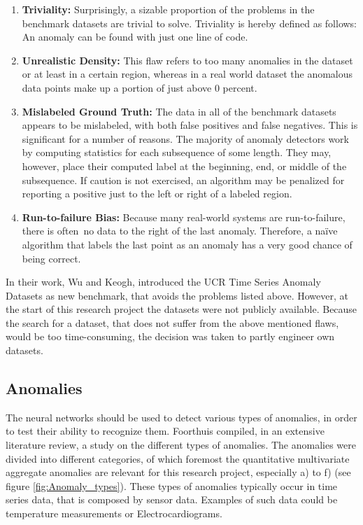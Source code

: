 \begin{enumerate}
	\item \textbf{Triviality:} Surprisingly, a sizable proportion of the problems in the benchmark datasets are trivial to solve. Triviality is hereby defined as follows: An anomaly can be found with just one line of code.
	\item \textbf{Unrealistic Density:} This flaw refers to too many anomalies in the dataset or at least in a certain region, whereas in a real world dataset the anomalous data points make up a portion of just above 0 percent.   
	\item \textbf{Mislabeled Ground Truth:} The data in all of the benchmark datasets appears to be mislabeled, with both false positives and false negatives. This is significant for a number of reasons. The majority of anomaly detectors work by computing statistics for each subsequence of some length. They may, however, place their computed label at the beginning, end, or middle of the subsequence. If caution is not exercised, an algorithm may be penalized for reporting a positive just to the left or right of a labeled region.
	\item \textbf{Run-to-failure Bias:} Because many real-world systems are run-to-failure, there is often no data to the right of the last anomaly. Therefore, a naïve algorithm that labels the last point as an anomaly has a very good chance of being correct.
\end{enumerate}

In their work, Wu and Keogh, introduced the UCR Time Series Anomaly Datasets as new benchmark, that avoids the problems listed above. However, at the start of this research project the datasets were not publicly available. Because the search for a dataset, that does not suffer from the above mentioned flaws, would be too time-consuming, the decision was taken to partly engineer own datasets.
\newline
\subsection{Anomalies}
The neural networks should be used to detect various types of anomalies, in order to test their ability to recognize them. Foorthuis \parencite*{Foorthuis2021} compiled, in an extensive literature review, a study on the different types of anomalies. The anomalies were divided into different categories, of which foremost the quantitative multivariate aggregate anomalies are relevant for this research project, especially a) to f) (see figure \ref{fig:Anomaly_types}). These types of anomalies typically occur in time series data, that is composed by sensor data. Examples of such data could be temperature measurements or Electrocardiograms.

